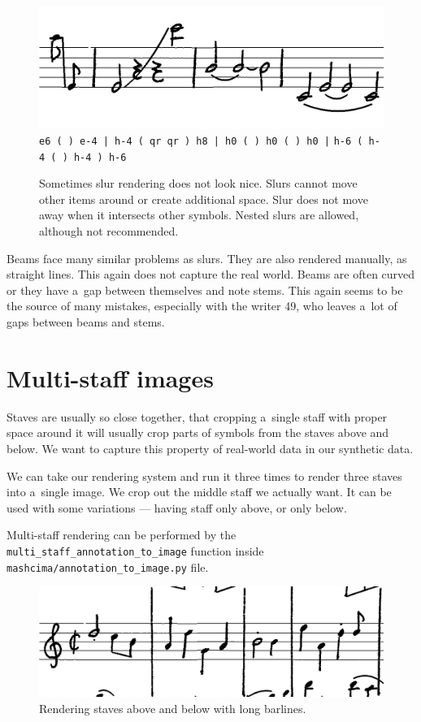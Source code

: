 \begin{figure}[h]
    \centering
    \includegraphics[width=120mm]{../img/failed-slurs}
    \verb`e6 ( ) e-4 | h-4 ( qr qr ) h8 | h0 ( ) h0 ( ) h0 |`
    \verb`h-6 ( h-4 ( ) h-4 ) h-6`
    \caption{Sometimes slur rendering does not look nice. Slurs cannot move other items around or create additional space. Slur does not move away when it intersects other symbols. Nested slurs are allowed, although not recommended.}
    \label{fig5:FailedSlurs}
\end{figure}

Beams face many similar problems as slurs. They are also rendered manually, as straight lines. This again does not capture the real world. Beams are often curved or they have a~gap between themselves and note stems. This again seems to be the source of many mistakes, especially with the writer 49, who leaves a~lot of gaps between beams and stems.


\section{Multi-staff images}

Staves are usually so close together, that cropping a~single staff with proper space around it will usually crop parts of symbols from the staves above and below. We want to capture this property of real-world data in our synthetic data.

We can take our rendering system and run it three times to render three staves into a~single image. We crop out the middle staff we actually want. It can be used with some variations --- having staff only above, or only below.

Multi-staff rendering can be performed by the \verb`multi_`\allowbreak\verb`staff_`\allowbreak\verb`annotation_`\allowbreak\verb`to_image` function inside \verb`mashcima/`\allowbreak\verb`annotation_`\allowbreak\verb`to_image.py` file.

\begin{figure}[h]
    \centering
    \includegraphics[width=120mm]{../img/multi-staff}
    \caption{Rendering staves above and below with long barlines.}
    \label{fig5:MultiStaff}
\end{figure}


